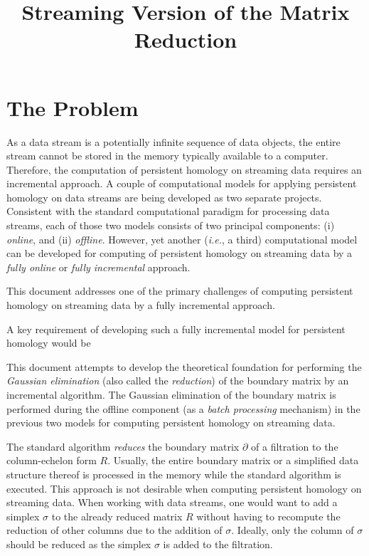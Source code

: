 \documentclass[11pt]{article}
\begin{document}
\title{Streaming Version of the Matrix Reduction}

\maketitle

\section{The Problem}

As a data stream is a potentially infinite sequence of data objects, the entire stream cannot be 
stored in the memory typically available to a computer.  Therefore, the computation of persistent 
homology on streaming data requires an incremental approach.  A couple of computational models for 
applying persistent homology on data streams are being developed as two separate projects.  
Consistent with the standard computational paradigm \cite{silva-13} for processing data streams, 
each of those two models consists of two principal components: (i) \emph{online}, and (ii) 
\emph{offline}.  However, yet another (\emph{i.e.}, a third) computational model can be developed 
for computing of persistent homology on streaming data by a \emph{fully online} or \emph{fully 
incremental} approach.



This document addresses one of the primary challenges of computing persistent homology on streaming 
data by a fully incremental approach.  

A key requirement of developing such a fully incremental model for persistent homology would be 


This document attempts to develop 
the theoretical foundation for performing the \emph{Gaussian elimination} (also called the 
\emph{reduction}) of the boundary matrix \cite{edelsbrunner-00, zomorodian-05} by an incremental 
algorithm.  The Gaussian elimination of the boundary matrix is performed during the offline 
component (as a \emph{batch processing} mechanism) in the previous two models for computing 
persistent homology on streaming data.


The standard algorithm \cite{edelsbrunner-00, zomorodian-05} \emph{reduces} the boundary matrix 
$\partial$ of a filtration \cite{zomorodian-10} to the column-echelon form $R$.  Usually, the 
entire boundary matrix or a simplified data structure thereof is processed in the memory while the 
standard algorithm is executed.  This approach is not desirable when computing persistent homology 
on streaming data.  When working with data streams, one would want to add a simplex $\sigma$ to the 
already reduced matrix $R$ without having to recompute the reduction of other columns due to the 
addition of $\sigma$.  Ideally, only the column of $\sigma$ should be reduced as the simplex 
$\sigma$ is added to the filtration.





\end{document}
